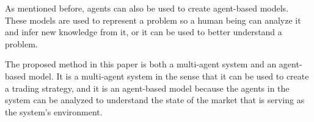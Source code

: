 \documentclass{ieeeaccess}
\begin{document}
As mentioned before, agents can also be used to create agent-based models. These
models are used to represent a problem so a human being can analyze it and infer
new knowledge from it, or it can be used to better understand a problem.

The proposed method in this paper is both a multi-agent system and an
agent-based model. It is a multi-agent system in the sense that it can be used
to create a trading strategy, and it is an agent-based model because the agents
in the system can be analyzed to understand the state of the market that is
serving as the system's environment.







\end{document}
